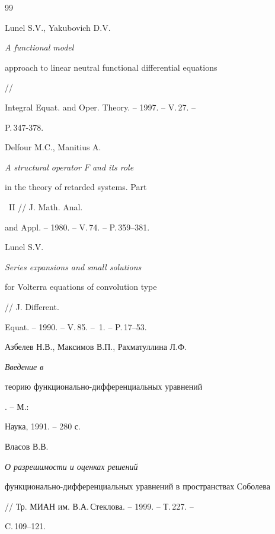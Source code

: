 \begin{thebibliography}{99}


Lunel S.V., Yakubovich D.V. {\em A functional model 


approach to linear neutral functional differential equations} // 


Integral Equat. and Oper. Theory. -- 1997. -- V.\,27. --


P.\,347-378. 




Delfour M.C., Manitius A. {\em A structural operator $F$ and its role 


in the theory of retarded systems. Part}~II // J. Math. Anal. 


and Appl. -- 1980. -- V.\,74. -- P.\,359--381. 




Lunel S.V. {\em Series expansions and small solutions 


for Volterra equations of convolution type} // J. Different. 


Equat. -- 1990. -- V.\,85. -- \No\,1. -- P.\,17--53. 




Азбелев Н.В., Максимов В.П., Рахматуллина Л.Ф. {\em Введение в 


теорию функционально-дифференциальных уравнений}. -- М.: 


Наука, 1991. -- 280 с. 




Власов В.В. {\em О разрешимости и оценках решений 


функционально-дифференциальных уравнений в пространствах Соболева} 


// Тр. МИАН им. В.А.\,Стеклова. -- 1999. -- Т.\,227. --


C.\,109--121. 


 


\end{thebibliography} 


 


\vskip 1cm 


 








